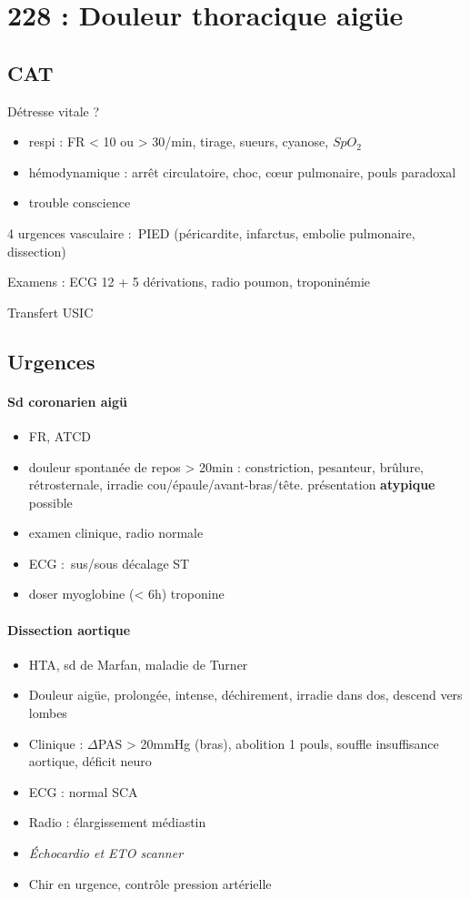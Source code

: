 \section{228 : Douleur thoracique aigüe}%
\label{sec:228_douleur_thoracique_aigue}

\subsection{CAT}
Détresse vitale ?
\begin{itemize}
  \item respi : FR < 10 ou > 30/min, tirage, sueurs, cyanose, $SpO_2$
  \item hémodynamique : arrêt circulatoire, choc, c\oe{}ur pulmonaire, pouls
    paradoxal
  \item trouble conscience
\end{itemize}

4 urgences vasculaire : PIED (péricardite, infarctus, embolie pulmonaire,
dissection)

Examens : ECG 12 + 5 dérivations, radio poumon, troponinémie

Transfert USIC

\subsection{Urgences}

\paragraph{Sd coronarien aigü}
\begin{itemize}
  \item FR, ATCD
  \item douleur spontanée de repos > 20min : constriction, pesanteur, brûlure,
    rétrosternale, irradie  cou/épaule/avant-bras/tête. \danger présentation
    \textbf{atypique} possible
  \item examen clinique, radio normale
  \item ECG : sus/sous décalage ST
  \item doser myoglobine (< 6h) \lor{} troponine
\end{itemize}

\paragraph{Dissection aortique}
\begin{itemize}
  \item HTA, sd de Marfan, maladie de Turner
  \item Douleur aigüe, prolongée, intense, déchirement, irradie dans dos, descend
    vers lombes
  \item Clinique : $\Delta$PAS > 20mmHg (bras), abolition 1 pouls, souffle
    insuffisance aortique, déficit neuro
  \item ECG : normal \lor{} SCA
  \item Radio : élargissement médiastin
  \item \textit{Échocardio et ETO \lor{} scanner} 
  \item Chir en urgence, contrôle pression artérielle
\end{itemize}

